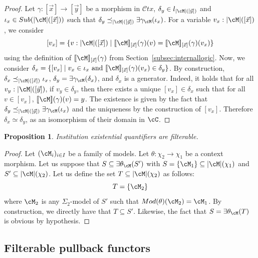 \documentclass[preprint,3p,times]{elsarticle}
\newtheorem{proposition}[definition]{Proposition}
\def\sem#1{[\![ #1 ] \!]}
\newcommand{\Ctx}{\mathcal{C}tx}
\newcommand{\set}[1]{\{#1\}}                                %
\begin{document}
\begin{proof}
Let \(\gamma : [\vec{x}] \to [\vec{y}]\) be a morphism in \(\Ctx\), \(\delta_y \in l_{|\cM|([\vec{y}])}\) and \(\iota_x \in Sub(|\cM|([\vec{x}]))\) such that \(\delta_y \preceq_{|\cM|([\vec{y}])} \exists \gamma_\cM(\iota_x)\).
For a variable \(v_x:|\cM|([\vec{x}])\), we consider
\[
[v_x] = \set{v:|\cM|([\vec{x}]) \mid \sem{\cM}_{[\vec{x}]}(\gamma)(v) = \sem{\cM}_{[\vec{x}]}(\gamma)(v_x)}
\]
using the definition of \(\sem{\cM}_{[\vec{x}]}(\gamma)\) from Section~\ref{subsec:internallogic}.
Now, we consider \(\delta_x = \set{[v_x] \mid v_x \in \iota_x ~\text{and}~  \sem{\cM}_{[\vec{x}]}(\gamma)(v_x) \in \delta_y}\). By construction, \mbox{\(\delta_x \preceq_{|\cM|([\vec{x}])} \iota_x\),} \(\delta_y = \exists \gamma_\cM(\delta_x)\), and \(\delta_x\) is a generator.
Indeed, it holds that for all \(v_y:|\cM|([\vec{y}])\), if \(v_y \in \delta_y\), then there exists a unique \([v_x] \in \delta_x\) such that for all \(v \in [v_x]\), \(\sem{\cM}(\gamma)(v) = y\). The existence is given by the fact that \(\delta_y \preceq_{|\cM|([\vec{y}])} \exists \gamma_\cM(\iota_x)\) and the uniqueness by the construction of \([v_x]\). Therefore \(\delta_x \simeq \delta_y\), as an isomorphism of their domain in \(\cC\).

\end{proof}

\begin{proposition}
Institution existential quantifiers are filterable.
\end{proposition}

\begin{proof}
Let $(\cM_i)_{i \in I}$ be a family of models. Let $\theta : \chi_2 \to \chi_1$ be a context morphism. 
Let us suppose that $S \subseteq \exists \theta_{\cM}(S')$ with $S = \{\cM_1\} \subseteq |\cM|(\chi_1)$ and $S' \subseteq |\cM|(\chi_2)$. Let us define the set $T \subseteq |\cM|(\chi_2)$ as follows:
$$T = \{\cM_2\}$$
where $\cM_2$ is any $\Sigma_2$-model of $S'$ such that $Mod(\theta)(\cM_2) = \cM_1$. 
By construction, we directly have that $T \subseteq S'$. Likewise,  the fact that $S = \exists \theta_\cM(T)$ is obvious by hypothesis.
\end{proof}

\medskip

\subsection{Filterable pullback functors}
\label{subsec:los:pullbacks}
\end{document}
